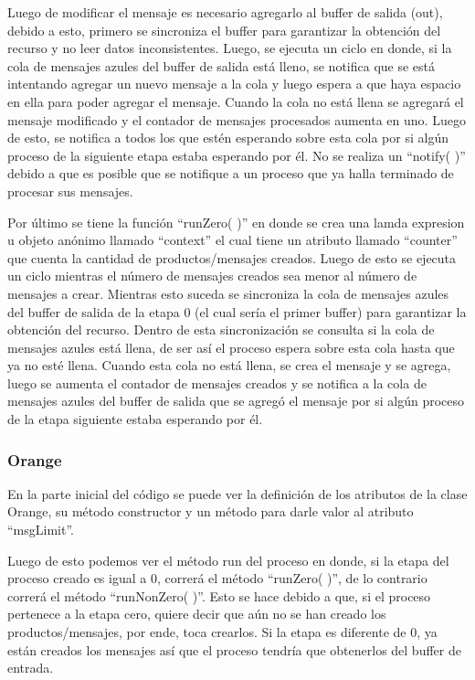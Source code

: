 \documentclass[a4paper]{article}
\begin{document}
        Luego de modificar el mensaje es necesario agregarlo al buffer de salida (out), debido a esto, primero se sincroniza el buffer para garantizar la obtención del recurso y no leer datos inconsistentes. Luego, se ejecuta un ciclo en donde, si la cola de mensajes azules del buffer de salida está lleno, se notifica que se está intentando agregar un nuevo mensaje a la cola y luego espera a que haya espacio en ella para poder agregar el mensaje. Cuando la cola no está llena se agregará el mensaje modificado y el contador de mensajes procesados aumenta en uno. Luego de esto, se notifica a todos los que estén esperando sobre esta cola por si algún proceso de la siguiente etapa estaba esperando por él. No se realiza un “notify( )” debido a que es posible que se notifique a un proceso que ya halla terminado de procesar sus mensajes. 

        Por último se tiene la función “runZero( )” en donde se crea una lamda expresion u objeto anónimo llamado “context” el cual tiene un atributo llamado “counter” que cuenta la cantidad de productos/mensajes creados. Luego de esto se ejecuta un ciclo mientras el número de mensajes creados sea menor al número de mensajes a crear. Mientras esto suceda se sincroniza la cola de mensajes azules del buffer de salida de la etapa 0 (el cual sería el primer buffer) para garantizar la obtención del recurso. Dentro de esta sincronización se consulta si la cola de mensajes azules está llena, de ser así el proceso espera sobre esta cola hasta que ya no esté llena. Cuando esta cola no está llena, se crea el mensaje y se agrega, luego se aumenta el contador de mensajes creados y se notifica a la cola de mensajes azules del buffer de salida que se agregó el mensaje por si algún proceso de la etapa siguiente estaba esperando por él. 
        
        \subsubsection{Orange}
        En la parte inicial del código se puede ver la definición de los atributos de la clase Orange, su método constructor y un método para darle valor al atributo “msgLimit”. 

        Luego de esto podemos ver el método run del proceso en donde, si la etapa del proceso creado es igual a 0, correrá el método “runZero( )”, de lo contrario correrá el método “runNonZero( )”. Esto se hace debido a que, si el proceso pertenece a la etapa cero, quiere decir que aún no se han creado los productos/mensajes, por ende, toca crearlos. Si la etapa es diferente de 0, ya están creados los mensajes así que el proceso tendría que obtenerlos del buffer de entrada. 
\end{document}
